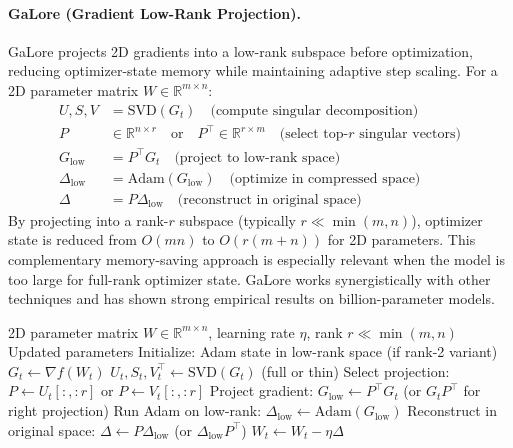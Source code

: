 \paragraph{GaLore (Gradient Low-Rank Projection).}
GaLore projects 2D gradients into a low-rank subspace before optimization, reducing optimizer-state memory while maintaining adaptive step scaling. For a 2D parameter matrix $W \in \mathbb{R}^{m \times n}$:
\begin{align}
U, S, V &= \text{SVD}(G_t) \quad\text{(compute singular decomposition)} \\
P &\in \mathbb{R}^{n \times r} \quad\text{or} \quad P^\top \in \mathbb{R}^{r \times m} \quad\text{(select top-$r$ singular vectors)} \\
G_{\text{low}} &= P^\top G_t \quad\text{(project to low-rank space)} \\
\Delta_{\text{low}} &= \text{Adam}(G_{\text{low}}) \quad\text{(optimize in compressed space)} \\
\Delta &= P \Delta_{\text{low}} \quad\text{(reconstruct in original space)}
\end{align}
By projecting into a rank-$r$ subspace (typically $r \ll \min(m,n)$), optimizer state is reduced from $O(mn)$ to $O(r(m+n))$ for 2D parameters. This complementary memory-saving approach is especially relevant when the model is too large for full-rank optimizer state. GaLore works synergistically with other techniques and has shown strong empirical results on billion-parameter models.

\begin{algorithm}[H]
\caption{GaLore (Gradient Low-Rank Projection)}
\label{alg:galore}
\begin{algorithmic}[1]
\Require 2D parameter matrix $W \in \mathbb{R}^{m \times n}$, learning rate $\eta$, rank $r \ll \min(m,n)$
\Ensure Updated parameters
\State Initialize: Adam state in low-rank space (if rank-2 variant)
    \State $G_t \gets \nabla f(W_t)$
      
        \State $U_t, S_t, V_t^\top \gets \text{SVD}(G_t)$ (full or thin)
        \State Select projection: $P \gets U_t[:, :r]$ or $P \gets V_t[:, :r]$
    \EndIf
    \State Project gradient: $G_{\text{low}} \gets P^\top G_t$ (or $G_t P^\top$ for right projection)
    \State Run Adam on low-rank: $\Delta_{\text{low}} \gets \text{Adam}(G_{\text{low}})$
    \State Reconstruct in original space: $\Delta \gets P \Delta_{\text{low}}$ (or $\Delta_{\text{low}} P^\top$)
    \State $W_t \gets W_t - \eta \Delta$
\EndFor
\end{algorithmic}
\end{algorithm}

